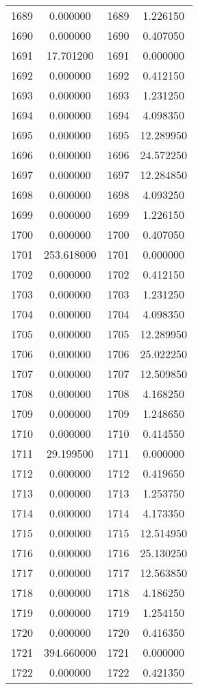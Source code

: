 \documentclass[12pt]{article}
\begin{document}
\begin{longtable}{@{}cccc@{}}
1689 & 0.000000 & 1689 & 1.226150 \\
1690 & 0.000000 & 1690 & 0.407050 \\
1691 & 17.701200 & 1691 & 0.000000 \\
1692 & 0.000000 & 1692 & 0.412150 \\
1693 & 0.000000 & 1693 & 1.231250 \\
1694 & 0.000000 & 1694 & 4.098350 \\
1695 & 0.000000 & 1695 & 12.289950 \\
1696 & 0.000000 & 1696 & 24.572250 \\
1697 & 0.000000 & 1697 & 12.284850 \\
1698 & 0.000000 & 1698 & 4.093250 \\
1699 & 0.000000 & 1699 & 1.226150 \\
1700 & 0.000000 & 1700 & 0.407050 \\
1701 & 253.618000 & 1701 & 0.000000 \\
1702 & 0.000000 & 1702 & 0.412150 \\
1703 & 0.000000 & 1703 & 1.231250 \\
1704 & 0.000000 & 1704 & 4.098350 \\
1705 & 0.000000 & 1705 & 12.289950 \\
1706 & 0.000000 & 1706 & 25.022250 \\
1707 & 0.000000 & 1707 & 12.509850 \\
1708 & 0.000000 & 1708 & 4.168250 \\
1709 & 0.000000 & 1709 & 1.248650 \\
1710 & 0.000000 & 1710 & 0.414550 \\
1711 & 29.199500 & 1711 & 0.000000 \\
1712 & 0.000000 & 1712 & 0.419650 \\
1713 & 0.000000 & 1713 & 1.253750 \\
1714 & 0.000000 & 1714 & 4.173350 \\
1715 & 0.000000 & 1715 & 12.514950 \\
1716 & 0.000000 & 1716 & 25.130250 \\
1717 & 0.000000 & 1717 & 12.563850 \\
1718 & 0.000000 & 1718 & 4.186250 \\
1719 & 0.000000 & 1719 & 1.254150 \\
1720 & 0.000000 & 1720 & 0.416350 \\
1721 & 394.660000 & 1721 & 0.000000 \\
1722 & 0.000000 & 1722 & 0.421350 \\

\end{longtable}
\end{document}
